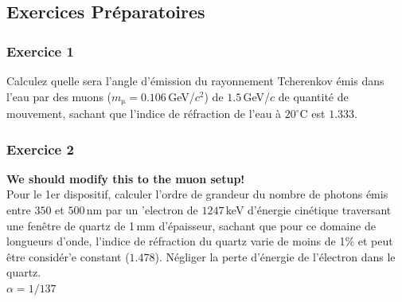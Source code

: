 \subsection{Exercices Pr\'eparatoires}

\subsubsection{Exercice 1}
Calculez quelle sera l'angle d'\'emission du rayonnement Tcherenkov \'emis dans l’eau par des muons ($m_\mathrm{\mu} = 0.106$\,GeV/$c^2$) de $1.5$\,GeV/$c$ de quantit\'e de mouvement, sachant que l'indice de r\'efraction de l'eau \`a $20^\circ$C est $1.333$.


\subsubsection{Exercice 2}
\textbf{We should modify this to the muon setup!}\\
Pour le 1er dispositif, calculer l'ordre de grandeur du nombre de photons \'emis entre $350$ et $500$\,nm par un 'electron de $1247$\,keV d'\'energie cin\'etique traversant une fen\^etre de quartz de 1\,mm d'\'epaisseur, sachant que pour ce domaine de longueurs d’onde, l'indice de r\'efraction du quartz varie de moins de 1\% et peut \^etre consid\'er'e constant ($1.478$). N\'egliger la perte d'\'energie de l'\'electron dans le quartz.\\ $\alpha = 1/137$


